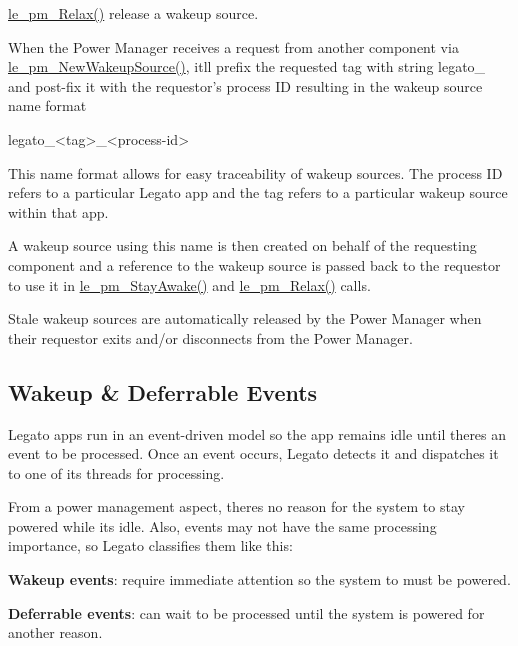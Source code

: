 \hyperlink{le__pm__interface_8h_a2ffb1fb0d165604226a9df35360080ea}{le\+\_\+pm\+\_\+\+Relax()} release a wakeup source.

When the Power Manager receives a request from another component via \hyperlink{le__pm__interface_8h_a85038248bcddc8963f7280ffa53acf62}{le\+\_\+pm\+\_\+\+New\+Wakeup\+Source()}, it\textquotesingle{}ll prefix the requested tag with string {\ttfamily legato\+\_\+} and post-\/fix it with the requestor’s process I\+D resulting in the wakeup source name format \begin{DoxyVerb}legato_<tag>_<process-id> \end{DoxyVerb}


This name format allows for easy traceability of wakeup sources. The process I\+D refers to a particular Legato app and the tag refers to a particular wakeup source within that app.

A wakeup source using this name is then created on behalf of the requesting component and a reference to the wakeup source is passed back to the requestor to use it in \hyperlink{le__pm__interface_8h_a6be9b6c443c506b0ce29da79e53e2534}{le\+\_\+pm\+\_\+\+Stay\+Awake()} and \hyperlink{le__pm__interface_8h_a2ffb1fb0d165604226a9df35360080ea}{le\+\_\+pm\+\_\+\+Relax()} calls.

Stale wakeup sources are automatically released by the Power Manager when their requestor exits and/or disconnects from the Power Manager.\hypertarget{how_to_power_mgmt_howToPowerMgmt_wakeupAndDeferrable}{}\subsection{Wakeup \& Deferrable Events}\label{how_to_power_mgmt_howToPowerMgmt_wakeupAndDeferrable}
Legato apps run in an event-\/driven model so the app remains idle until there\textquotesingle{}s an event to be processed. Once an event occurs, Legato detects it and dispatches it to one of its threads for processing.

From a power management aspect, there\textquotesingle{}s no reason for the system to stay powered while it\textquotesingle{}s idle. Also, events may not have the same processing importance, so Legato classifies them like this\+:


\begin{DoxyItemize}
\item {\bfseries Wakeup events}\+: require immediate attention so the system to must be powered.
\item {\bfseries Deferrable events}\+: can wait to be processed until the system is powered for another reason.
\end{DoxyItemize}

